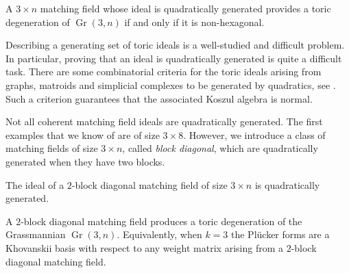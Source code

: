 \documentclass[ALCO,ThmDefs,Unicode,epreuves]{cedram}
\DeclareMathOperator{\Gr}{Gr}
\begin{document}
\begin{theo}\label{Theorem:iff}
A $3 \times n$ matching field whose ideal is quadratically generated provides a toric degeneration of $\Gr(3, n)$ if and only if it is non-hexagonal. 
\end{theo}

Describing a generating set of toric ideals is a well-studied and difficult problem. In particular, proving that an ideal is quadratically generated is quite a difficult task. There are some combinatorial criteria for the toric ideals arising from graphs, matroids and simplicial complexes to be generated by quadratics, see \eg \cite{White, Ohsugi, Cone, Mateusz}. Such a criterion guarantees that the associated Koszul algebra is normal. 

Not all coherent matching field ideals are quadratically generated. The first examples that we know of are of size $3 \times 8$. 
However, we introduce a class of matching fields of size $3 \times n$, called \emph{block diagonal}, which are quadratically generated when they have two blocks. 



\begin{theo}\label{Theorem:2block}
The ideal of a $2$-block diagonal matching field of size $3 \times n$ is quadratically generated. 
\end{theo}

\begin{coro}\label{cor:blockdiag}
A $2$-block diagonal matching field produces a toric degeneration of the Grassmannian $\Gr(3, n)$. 
Equivalently, when $k= 3$ the Pl{\"u}cker forms are a Khovanskii basis with respect to any weight matrix arising from a $2$-block diagonal matching field. 
\end{coro}
\end{document}
